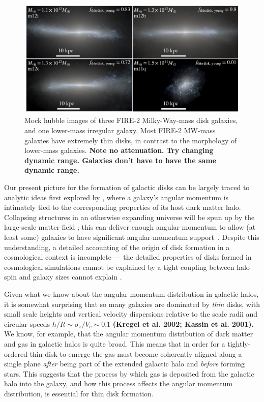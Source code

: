 \documentclass[fleqn,usenatbib]{mnras}
\begin{document}
\begin{figure}
    \centering
    \includegraphics[width=\textwidth]{figures/stars.pdf}
    \caption{
    Mock hubble images of three FIRE-2 Milky-Way-mass disk galaxies, and one lower-mass irregular galaxy.
    Most FIRE-2 MW-mass galaxies have extremely thin disks, in contrast to the morphology of lower-mass galaxies.
    \textbf{Note no attenuation.}
    \textbf{
    Try changing dynamic range.
    Galaxies don't have to have the same dynamic range.
    }
    }
    \label{f: stars}
\end{figure}

Our present picture for the formation of galactic disks can be largely traced to analytic ideas first explored by \citet{fall1980}, where a galaxy's angular momentum is intimately tied to the corresponding properties of its host dark matter halo.
Collapsing structures in an otherwise expanding universe will be spun up by the large-scale matter field \citep{Peebles69};
this can deliver enough angular momentum to allow (at least some) galaxies to have significant angular-momentum support~\citep[e.g.][]{MMW98}. 
Despite this understanding, a detailed accounting of the origin of disk formation in a cosmological context is incomplete --- the detailed properties of disks formed in cosmological simulations cannot be explained by a tight coupling between halo spin and galaxy sizes cannot explain \citep[e.g.][]{GK18}.  

Given what we know about the angular momentum distribution in galactic halos, it is somewhat surprising that so many galaxies are dominated by {\em thin} disks, with small scale heights and vertical velocity dispersions relative to the scale radii and circular speeds $h/R \sim \sigma_z/V_c \sim 0.1$ \textbf{(Kregel et al. 2002; Kassin et al. 2001).}
We know, for example, that the angular momentum distribution of dark matter \citep{B01} and gas \citep{Stewart13,DeFelippis2020} in galactic halos is quite broad.
This means that in order for a tightly-ordered thin disk to emerge the gas must become coherently aligned along a single plane \textit{after} being part of the extended galactic halo and \textit{before} forming stars.
This suggests that the process by which gas is deposited from the galactic halo into the galaxy, and how this process affects the angular momentum distribution, is essential for thin disk formation.
\end{document}
